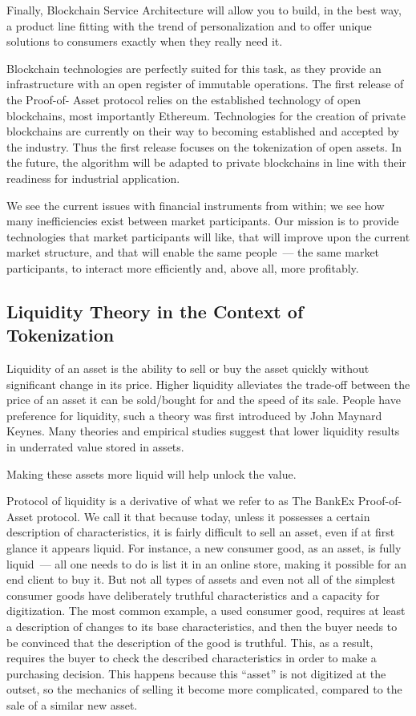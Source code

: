 \documentclass{article}
\begin{document}
\begin{multicols}{2}
Finally, Blockchain Service Architecture will allow you to build, in the best way, a product line fitting with the trend of personalization and to offer unique solutions to consumers exactly when they really need it.

Blockchain technologies are perfectly suited for this task, as they provide an infrastructure with an open register of immutable operations. The first release of the Proof-of- Asset protocol relies on the established technology of open blockchains, most importantly Ethereum. Technologies for the creation of private blockchains are currently on their way to becoming established and accepted by the industry. Thus the first release focuses on the tokenization of open assets. In the future, the algorithm will be adapted to private blockchains in line with their readiness for industrial application.

We see the current issues with financial instruments from within; we see how many inefficiencies exist between market participants. Our mission is to provide technologies that market participants will like, that will improve upon the current market structure, and that will enable the same people~--- the same market participants, to interact more efficiently and, above all, more profitably.

\subsection{Liquidity Theory in the Context of Tokenization}

Liquidity of an asset is the ability to sell or buy the asset quickly without significant change in its price. Higher liquidity alleviates the trade-off between the price of an asset it can be sold/bought for and the speed of its sale. People have preference for liquidity, such a theory was first introduced by John Maynard Keynes. Many theories and empirical studies suggest that lower liquidity results in underrated value stored in assets. 

Making these assets more liquid will help unlock the value.

Protocol of liquidity is a derivative of what we refer to as The BankEx Proof-of-Asset protocol. We call it that because today, unless it possesses a certain description of characteristics, it is fairly difficult to sell an asset, even if at first glance it appears liquid. For instance, a new consumer good, as an asset, is fully liquid~--- all one needs to do is list it in an online store,  making it possible for an end client to buy it. But not all types of assets and even not all of the simplest consumer goods have deliberately truthful characteristics and a capacity for digitization. The most common example, a used consumer good, requires at least a description of changes to its base characteristics, and then the buyer needs to be convinced that the description of the good is truthful. This, as a result, requires the buyer to check the described characteristics in order to make a purchasing decision. This happens because this “asset” is not digitized at the outset, so the mechanics of selling it become more complicated, compared to the sale of a similar new asset. 


\end{multicols}
\end{document}
